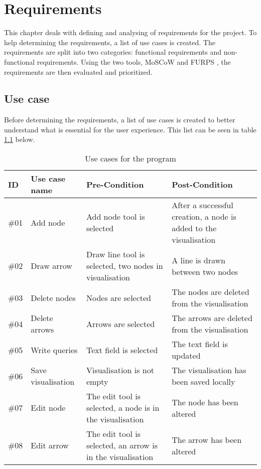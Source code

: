 \chapter{Requirements}
\label{chap:requirements}

This chapter deals with defining and analysing of requirements for the project. To help determining the requirements, a list of use cases is created. The requirements are split into two categories: functional requirements and non-functional requirements. Using the two tools, MoSCoW  and FURPS , the requirements are then evaluated and prioritized.

\section{Use case}
Before determining the requirements, a list of use cases  is created to better understand what is essential for the user experience. This list can be seen in table \ref{tab:usecases} below.

\begin{table}[h]
\begin{tabularx}{\textwidth}{|l|l|X|X|}
\hline
\rowcolor[HTML]{9B9B9B}
ID   & Use case name      & Pre-Condition                                               & Post-Condition                                                    \\ \hline
\#01 & Add node           & Add node tool is selected                                   & After a successful creation, a node is added to the visualisation \\ \hline
\#02 & Draw arrow         & Draw line tool is selected, two nodes in visualisation      & A line is drawn between two nodes                                 \\\hline
\#03 & Delete nodes       & Nodes are selected                                          & The nodes are deleted from the visualisation                      \\\hline
\#04 & Delete arrows      & Arrows are selected                                         & The arrows are deleted from the visualisation                     \\\hline
\#05 & Write queries      & Text field is selected                                      & The text field is updated                                         \\\hline
\#06 & Save visualisation & Visualisation is not empty                                  & The visualisation has been saved locally                          \\\hline
\#07 & Edit node          & The edit tool is selected, a node is in the visualisation   & The node has been altered                                         \\\hline
\#08 & Edit arrow         & The edit tool is selected, an arrow is in the visualisation & The arrow has been altered    \\\hline   
\end{tabularx}
\label{tab:usecases}
\caption{Use cases for the program}
\end{table}

